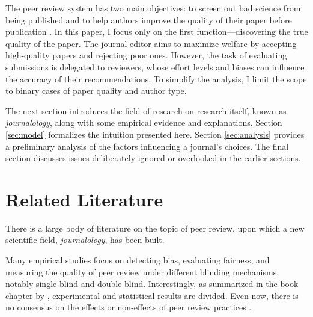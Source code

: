 \documentclass[12pt]{article}
\begin{document}
The peer review system has two main objectives: to screen out bad science from
being published and to help authors improve the quality of their paper before
publication \citep{tan2018peer}. In this paper, I focus only on the first
function—discovering the true quality of the paper. The journal editor aims to
maximize welfare by accepting high-quality papers and rejecting poor ones.
However, the task of evaluating submissions is delegated to reviewers, whose
effort levels and biases can influence the accuracy of their recommendations.
To simplify the analysis, I limit the scope to binary cases of paper quality
and author type.

The next section introduces the field of research on research itself, known as
\textit{journalology}, along with some empirical evidence and explanations.
Section \ref{sec:model} formalizes the intuition presented here. Section
\ref{sec:analysis} provides a preliminary analysis of the factors influencing a
journal's choices. The final section discusses issues deliberately ignored or
overlooked in the earlier sections.

\section{Related Literature}
There is a large body of literature on the topic of peer review, upon which a
new scientific field, \textit{journalology}, has been built.

Many empirical studies focus on detecting bias, evaluating fairness, and
measuring the quality of peer review under different blinding mechanisms,
notably single-blind and double-blind. Interestingly, as summarized in the book
chapter by \citet{largent2016blind}, experimental and statistical results are
divided. Even now, there is no consensus on the effects or non-effects of peer
review practices \cite{blank1991effects,tomkins2017reviewer}.
\end{document}
